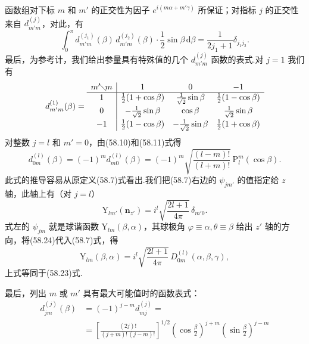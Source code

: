 函数组对下标 $m$ 和 $m'$ 的正交性为因子 $e^{i(m\alpha+m'\gamma)}$ 所保证；对指标 $j$ 的正交性来自 $d^{(j)}_{m'm}$，对此，有
\begin{equation}
  \int_0^{\pi}d^{(j_1)}_{m'm}(\beta)\,d^{(j_2)}_{m'm}(\beta)\cdot
  \frac{1}{2}\sin\beta\,\mathrm{d}\beta
  =\frac{1}{2j_1+1}\delta_{j_1j_2}.
\end{equation}
最后，为参考计，我们给出参量具有特殊值的几个 $d^{(j)}_{m'm}$ 函数的表式.对 $j=1$ 我们有
\begin{equation}
  d^{(1)}_{m'm}(\beta)=
  \begin{array}{c|ccc}
  m'\!\diagdown\!m & 1 & 0 & -1\\ \hline
  1 & \frac{1}{2}(1+\cos\beta) & \frac{1}{\sqrt{2}}\sin\beta & \frac{1}{2}(1-\cos\beta)\\[0.4em]
  0 & -\frac{1}{\sqrt{2}}\sin\beta & \cos\beta & \frac{1}{\sqrt{2}}\sin\beta\\[0.4em]
  -1 & \frac{1}{2}(1-\cos\beta) & -\frac{1}{\sqrt{2}}\sin\beta & \frac{1}{2}(1+\cos\beta)
  \end{array}
\end{equation}
对整数 $j=l$ 和 $m'=0$，由(58.10)和(58.11)式得
\begin{equation}
  d^{(l)}_{0m}(\beta)=(-1)^m d^{(l)}_{m0}(\beta)
  =(-1)^m\sqrt{\frac{(l-m)!}{(l+m)!}}\,\mathrm{P}_l^m(\cos\beta).
\end{equation}
此式的推导容易从原定义(58.7)式看出.我们把(58.7)右边的 $\psi_{jm'}$ 的值指定给 $z$ 轴，此轴上有（对 $j=l$）
\begin{equation}
  \mathrm{Y}_{lm'}(\boldsymbol{n}_{z'})=i^l\sqrt{\frac{2l+1}{4\pi}}\,\delta_{m'0}.
\end{equation}
式左的 $\psi_{jm}$ 就是球谐函数 $\mathrm{Y}_{lm}(\beta,\alpha)$，其球极角 $\varphi\equiv\alpha,\theta\equiv\beta$ 给出 $z'$ 轴的方向，将(58.24)代入(58.7)式，得
\begin{equation}
  \mathrm{Y}_{lm}(\beta,\alpha)=i^l\sqrt{\frac{2l+1}{4\pi}}\,
  D^{(l)}_{0m}(\alpha,\beta,\gamma),
\end{equation}
上式等同于(58.23)式.

最后，列出 $m$ 或 $m'$ 具有最大可能值时的函数表式：
\begin{equation}
\begin{aligned}
  d^{(j)}_{jm}(\beta)&=(-1)^{j-m}d^{(j)}_{mj}=\\
  &=\left[\frac{(2j)!}{(j+m)!\,(j-m)!}\right]^{1/2}
  \left(\cos\frac{\beta}{2}\right)^{j+m}
  \left(\sin\frac{\beta}{2}\right)^{j-m}
\end{aligned}
\end{equation}

